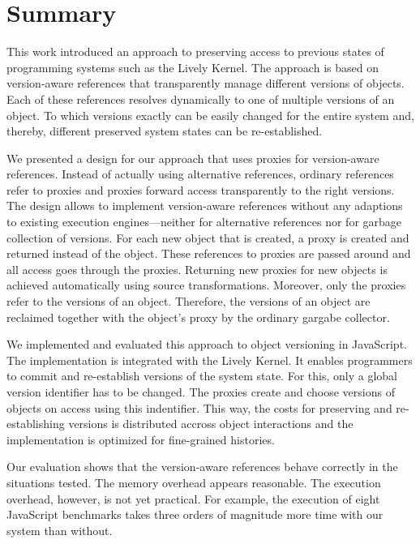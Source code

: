\chapter{Summary} \label{chapter:SUMMARY}

This work introduced an approach to preserving access to previous states of programming systems such as the Lively Kernel.
The approach is based on version-aware references that transparently manage different versions of objects.
Each of these references resolves dynamically to one of multiple versions of an object.
To which versions exactly can be easily changed for the entire system and, thereby, different preserved system states can be re-established.

We presented a design for our approach that uses proxies for version-aware references.
Instead of actually using alternative references, ordinary references refer to proxies and proxies forward access transparently to the right versions.
The design allows to implement version-aware references without any adaptions to existing execution engines---neither for alternative references nor for garbage collection of versions.
For each new object that is created, a proxy is created and returned instead of the object.
These references to proxies are passed around and all access goes through the proxies.
Returning new proxies for new objects is achieved automatically using source transformations.
Moreover, only the proxies refer to the versions of an object.
Therefore, the versions of an object are reclaimed together with the object's proxy by the ordinary gargabe collector.

We implemented and evaluated this approach to object versioning in JavaScript.
The implementation is integrated with the Lively Kernel.
It enables programmers to commit and re-establish versions of the system state.
For this, only a global version identifier has to be changed.
The proxies create and choose versions of objects on access using this indentifier.
This way, the costs for preserving and re-establishing versions is distributed accross object interactions and the implementation is optimized for fine-grained histories.

Our evaluation shows that the version-aware references behave correctly in the situations tested.
The memory overhead appears reasonable.
The execution overhead, however, is not yet practical.
For example, the execution of eight JavaScript benchmarks takes three orders of magnitude more time with our system than without.

